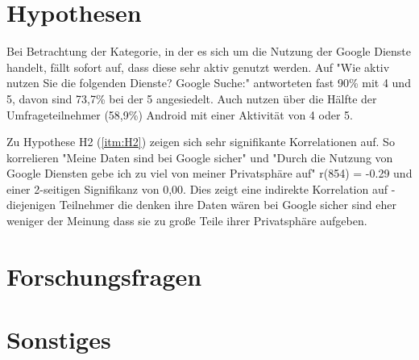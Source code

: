 \section{Hypothesen}
Bei Betrachtung der Kategorie, in der es sich um die Nutzung der Google Dienste handelt, fällt sofort auf, dass diese sehr aktiv genutzt werden. Auf "Wie aktiv nutzen Sie die folgenden Dienste? Google Suche:" antworteten fast 90\% mit 4 und 5, davon sind 73,7\% bei der 5 angesiedelt. Auch nutzen über die Hälfte der Umfrageteilnehmer (58,9\%) Android mit einer Aktivität von 4 oder 5.

Zu Hypothese H2 (\ref{itm:H2}) zeigen sich sehr signifikante Korrelationen auf. So korrelieren "Meine Daten sind bei Google sicher" und "Durch die Nutzung von Google Diensten gebe ich zu viel von meiner Privatsphäre auf" r(854) = -0.29 und einer 2-seitigen Signifikanz von 0,00. Dies zeigt eine indirekte Korrelation auf - diejenigen Teilnehmer die denken ihre Daten wären bei Google sicher sind eher weniger der Meinung dass sie zu große Teile ihrer Privatsphäre aufgeben.

\section{Forschungsfragen}

\section{Sonstiges}
